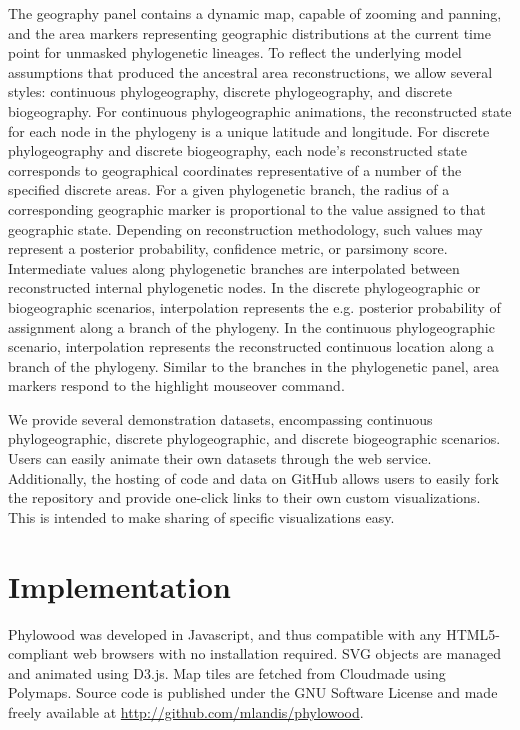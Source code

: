 \documentclass{bioinfo}
\begin{document}
The geography panel contains a dynamic map, capable of zooming and panning, and the area markers representing geographic distributions at the current time point for unmasked phylogenetic lineages. To reflect the underlying model assumptions that produced the ancestral area reconstructions, we allow several styles: continuous phylogeography, discrete phylogeography, and discrete biogeography. For continuous phylogeographic animations, the reconstructed state for each node in the phylogeny is a unique latitude and longitude. For discrete phylogeography and discrete biogeography, each node's reconstructed state corresponds to geographical coordinates representative of a number of the specified discrete areas. For a given phylogenetic branch, the radius of a corresponding geographic marker is proportional to the value assigned to that geographic state. Depending on reconstruction methodology, such values may represent a posterior probability, confidence metric, or parsimony score. Intermediate values along phylogenetic branches are interpolated between reconstructed internal phylogenetic nodes. In the discrete phylogeographic or biogeographic scenarios, interpolation represents the e.g. posterior probability of assignment along a branch of the phylogeny. In the continuous phylogeographic scenario, interpolation represents the reconstructed continuous location along a branch of the phylogeny. Similar to the branches in the phylogenetic panel, area markers respond to the highlight mouseover command.

We provide several demonstration datasets, encompassing continuous phylogeographic, discrete phylogeographic, and discrete biogeographic scenarios. Users can easily animate their own datasets through the web service. Additionally, the hosting of code and data on GitHub allows users to easily fork the repository and provide one-click links to their own custom visualizations. This is intended to make sharing of specific visualizations easy.

\section{Implementation}

Phylowood was developed in Javascript, and thus compatible with any HTML5-compliant web browsers with no installation required. SVG objects are managed and animated using D3.js. Map tiles are fetched from Cloudmade using Polymaps. Source code is published under the GNU Software License and made freely available at \href{http://github.com/mlandis/phylowood}{http://github.com/mlandis/phylowood}.
\end{document}
